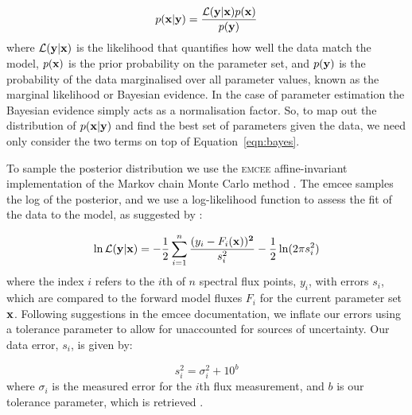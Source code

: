 \documentclass[useAMS,usenatbib]{mn2e}
\newcommand{\likL}{\mathcal{L}}
\begin{document}
\begin{equation}
p({\bf x} | {\bf y}) = \frac{\likL({\bf y} | {\bf x}) p({\bf x})}{p({\bf y})}
\label{eqn:bayes}
\end{equation}
where $\likL({\bf y} | {\bf x})$ is the likelihood that quantifies how well the data match the model, $p({\bf x})$ is the prior probability on the parameter set, and $p({\bf y})$ is the probability of the data marginalised over all parameter values, known as the marginal likelihood or Bayesian evidence.  In the case of parameter estimation the Bayesian evidence simply acts as a normalisation factor. So, to map out the distribution of $p({\bf x} | {\bf y})$ and find the best set of parameters given the data, we need only consider the two terms on top of Equation~\ref{eqn:bayes}.

To sample the posterior distribution we use the \textsc{emcee} affine-invariant implementation of the Markov chain Monte Carlo method \citep{emcee}.  The {\sc emcee} samples the log of the posterior, and we use a log-likelihood function to assess the fit of the data to the model, as suggested by \citet{emcee}:

\begin{equation}
\ln \likL({\bf y} | {\bf x}) = - \frac{1}{2} \sum_{i = 1}^{n} \frac{(y_{i} - F_{i}(\bf x))^2}{s^{2}_{i}} - \frac{1}{2} \ln(2 \pi s^{2}_{i}) 
\label{eqn:lnlik}
\end{equation}
where the index $i$ refers to the $i$th of $n$ spectral flux points, $y_i$, with errors $s_i$,  which are compared to the forward model fluxes $F_i$ for the current parameter set ${\bf x}$. Following suggestions in the {\sc emcee} documentation, we inflate our errors using a tolerance parameter to allow for unaccounted for sources of uncertainty. Our data error, $s_i$, is given by: 

\begin{equation}
s_{i}^{2} = \sigma_{i}^{2} + 10^{b}
\end{equation}
where $\sigma_i$ is the measured error for the $i$th flux measurement, and $b$ is our tolerance parameter, which is retrieved \citep{emcee,hogg2010,tremaine2002}. 
\end{document}
